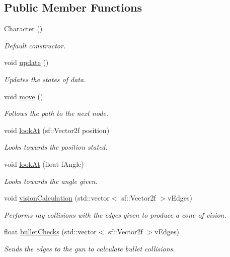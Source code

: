 \subsection*{Public Member Functions}
\begin{DoxyCompactItemize}
\item 
\hyperlink{class_character_adc27bdd255876169bad2ed0bae0cffb5}{Character} ()
\begin{DoxyCompactList}\small\item\em Default constructor. \end{DoxyCompactList}\item 
void \hyperlink{class_character_ab9168412ef9b2c8726b0de4dfb63e604}{update} ()
\begin{DoxyCompactList}\small\item\em Updates the states of data. \end{DoxyCompactList}\item 
void \hyperlink{class_character_a639f0dfe68079c01cb702073a6451659}{move} ()
\begin{DoxyCompactList}\small\item\em Follows the path to the next node. \end{DoxyCompactList}\item 
void \hyperlink{class_character_a141b0f98a619a88017eba5675268f3ab}{look\+At} (sf\+::\+Vector2f position)
\begin{DoxyCompactList}\small\item\em Looks towards the position stated. \end{DoxyCompactList}\item 
void \hyperlink{class_character_ac8c9b33398ecc1fd527e4d392b68bb5e}{look\+At} (float f\+Angle)
\begin{DoxyCompactList}\small\item\em Looks towards the angle given. \end{DoxyCompactList}\item 
void \hyperlink{class_character_a9852ca921b44387636f6dc268afc95bb}{vision\+Calculation} (std\+::vector$<$ sf\+::\+Vector2f $>$v\+Edges)
\begin{DoxyCompactList}\small\item\em Performs ray collisions with the edges given to produce a cone of vision. \end{DoxyCompactList}\item 
float \hyperlink{class_character_a3f46233c0f715380c50469b9a875cb48}{bullet\+Checks} (std\+::vector$<$ sf\+::\+Vector2f $>$v\+Edges)
\begin{DoxyCompactList}\small\item\em Sends the edges to the gun to calculate bullet collisions. \end{DoxyCompactList}\item 

\end{DoxyCompactItemize}
